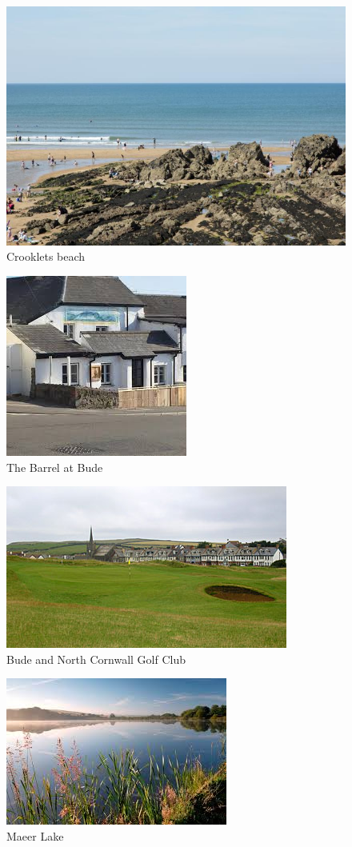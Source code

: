 \documentclass[]{article}
\begin{document}
\begin{figure}
\centering
\includegraphics{Crooklets beach.jpg}
\caption{Crooklets beach}
\end{figure}

\begin{figure}
\centering
\includegraphics{The Barrel at Bude.jpeg}
\caption{The Barrel at Bude}
\end{figure}

\begin{figure}
\centering
\includegraphics{golf.jpg}
\caption{Bude and North Cornwall Golf Club}
\end{figure}

\begin{figure}
\centering
\includegraphics{maer lake.jpeg}
\caption{Maeer Lake}
\end{figure}
\end{document}
